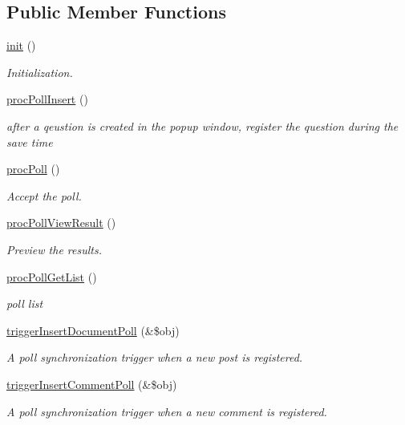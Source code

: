 \subsection*{Public Member Functions}
\begin{DoxyCompactItemize}
\item 
\hyperlink{classpollController_a963891da278c1adc2400f688270342a2}{init} ()
\begin{DoxyCompactList}\small\item\em Initialization. \end{DoxyCompactList}\item 
\hyperlink{classpollController_a22722ed2a0810a54f9abfd098cd3d25c}{proc\+Poll\+Insert} ()
\begin{DoxyCompactList}\small\item\em after a qeustion is created in the popup window, register the question during the save time \end{DoxyCompactList}\item 
\hyperlink{classpollController_a78770967734dc31fdfe1bba48d7e6196}{proc\+Poll} ()
\begin{DoxyCompactList}\small\item\em Accept the poll. \end{DoxyCompactList}\item 
\hyperlink{classpollController_a0fedbcad279a12cdf95a0f1d878bbfea}{proc\+Poll\+View\+Result} ()
\begin{DoxyCompactList}\small\item\em Preview the results. \end{DoxyCompactList}\item 
\hyperlink{classpollController_a7b10edf49b567e9d239c2e6bf8b12e93}{proc\+Poll\+Get\+List} ()
\begin{DoxyCompactList}\small\item\em poll list \end{DoxyCompactList}\item 
\hyperlink{classpollController_ae2ad5e6f6c89c2aee07208a8a66ef5e7}{trigger\+Insert\+Document\+Poll} (\&\$obj)
\begin{DoxyCompactList}\small\item\em A poll synchronization trigger when a new post is registered. \end{DoxyCompactList}\item 
\hyperlink{classpollController_a9676dc5c2762bf1c7818828d6ccf3efa}{trigger\+Insert\+Comment\+Poll} (\&\$obj)
\begin{DoxyCompactList}\small\item\em A poll synchronization trigger when a new comment is registered. \end{DoxyCompactList}\item 

\end{DoxyCompactItemize}
